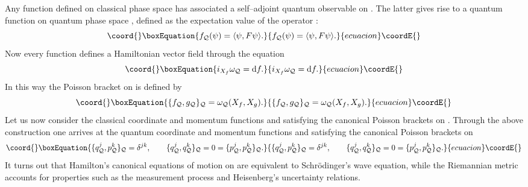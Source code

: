 \documentclass[a4paper,a4paper]{article}
\begin{document}
Any function \coordHE{} defined on classical phase 
space \coordHE{} has associated a self--adjoint quantum observable \coordHE{}
on \coordHE{}. The latter gives rise to a quantum function \coordHE{}
on quantum phase space \coordHE{}, defined as the expectation value of the operator \coordHE{}:
\begin{equation}\coord{}\boxEquation{
f_{\cal Q}(\psi)=\langle\psi,F\psi\rangle.
\label{func}
}{
f_{\cal Q}(\psi)=\langle\psi,F\psi\rangle.
}{ecuacion}\coordE{}\end{equation} 
Now every function \coordHE{} defines a Hamiltonian vector field 
\coordHE{} through the equation \cite{RATIU}
\begin{equation}\coord{}\boxEquation{
i_{X_f} \omega_{\cal Q} = {\rm d} f.
\label{hamvf}
}{
i_{X_f} \omega_{\cal Q} = {\rm d} f.
}{ecuacion}\coordE{}\end{equation}
In this way the Poisson bracket \coordHE{} on \coordHE{} is defined 
by \cite{RATIU}
\begin{equation}\coord{}\boxEquation{
\{f_{\cal Q}, g_{\cal Q}\}_{\cal Q} = \omega_{\cal Q} (X_f, X_g).
\label{pois}
}{
\{f_{\cal Q}, g_{\cal Q}\}_{\cal Q} = \omega_{\cal Q} (X_f, X_g).
}{ecuacion}\coordE{}\end{equation} 
Let us now consider the classical coordinate and momentum  
functions \coordHE{} and \coordHE{} satisfying the 
canonical Poisson brackets on \coordHE{}. Through the above construction one arrives at 
the quantum coordinate and momentum functions \coordHE{} and \coordHE{}
satisfying the canonical Poisson brackets on \coordHE{}
\begin{equation}\coord{}\boxEquation{
\{q^j_{\cal Q}, p^k_{\cal Q}\}_{\cal Q}=\delta^{jk},\qquad
\{q^j_{\cal Q}, q^k_{\cal Q}\}_{\cal Q}=0=\{p^j_{\cal Q}, p^k_{\cal Q}\}_{\cal Q}.
}{
\{q^j_{\cal Q}, p^k_{\cal Q}\}_{\cal Q}=\delta^{jk},\qquad
\{q^j_{\cal Q}, q^k_{\cal Q}\}_{\cal Q}=0=\{p^j_{\cal Q}, p^k_{\cal Q}\}_{\cal Q}.
}{ecuacion}\coordE{}\end{equation}
It turns out that Hamilton's canonical equations of motion on \coordHE{} are equivalent 
to Schr\"odinger's  wave equation, while the Riemannian metric \coordHE{} accounts for properties 
such as the measurement process and Heisenberg's uncertainty relations.
\end{document}
